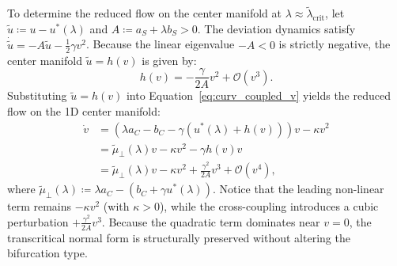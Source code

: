 \documentclass{article}
\theoremstyle{plain}
\theoremstyle{definition}
\begin{document}
To determine the reduced flow on the center manifold at $\lambda \approx \tilde{\lambda}_{\text{crit}}$, let $\tilde{u} \coloneqq u - u^*(\lambda)$ and $A \coloneqq a_S + \lambda b_S > 0$. The deviation dynamics satisfy $\dot{\tilde{u}} = -A \tilde{u} - \frac{1}{2} \gamma v^2$. Because the linear eigenvalue $-A < 0$ is strictly negative, the center manifold $\tilde{u} = h(v)$ is given by:
\begin{equation}
    h(v) = -\frac{\gamma}{2A} v^2 + \mathcal{O}(v^3).
\end{equation}
Substituting $\tilde{u} = h(v)$ into Equation~\eqref{eq:curv_coupled_v} yields the reduced flow on the 1D center manifold:
\begin{align}
    \dot{v} &= \left( \lambda a_C - b_C - \gamma (u^*(\lambda) + h(v)) \right) v - \kappa v^2 \nonumber \\
    &= \tilde{\mu}_\perp(\lambda) v - \kappa v^2 - \gamma h(v) v \nonumber \\
    &= \tilde{\mu}_\perp(\lambda) v - \kappa v^2 + \frac{\gamma^2}{2A} v^3 + \mathcal{O}(v^4),
\end{align}
where $\tilde{\mu}_\perp(\lambda) \coloneqq \lambda a_C - (b_C + \gamma u^*(\lambda))$. Notice that the leading non-linear term remains $-\kappa v^2$ (with $\kappa > 0$), while the cross-coupling introduces a cubic perturbation $+\frac{\gamma^2}{2A} v^3$. Because the quadratic term dominates near $v = 0$, the transcritical normal form is structurally preserved without altering the bifurcation type.
\end{document}

